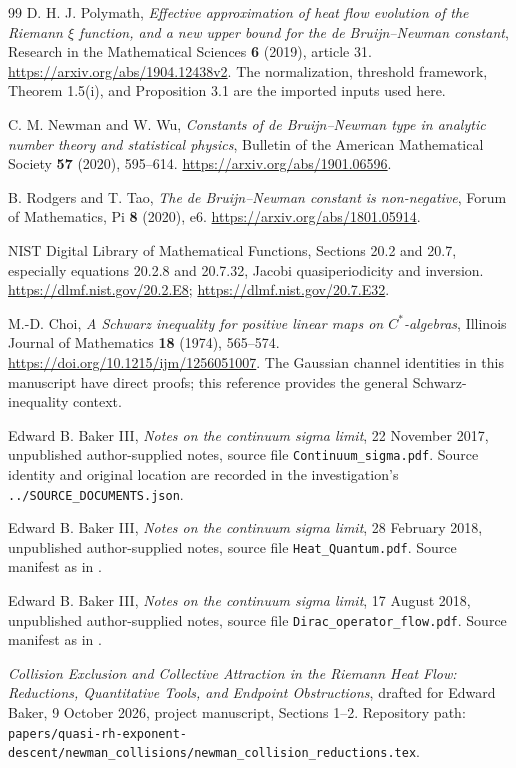 \documentclass[11pt]{article}
\numberwithin{equation}{section}
\theoremstyle{definition}
\theoremstyle{remark}
\begin{document}
\begin{thebibliography}{99}
D. H. J. Polymath,
\emph{Effective approximation of heat flow evolution of the Riemann
$\xi$ function, and a new upper bound for the de Bruijn--Newman constant},
Research in the Mathematical Sciences \textbf{6} (2019), article 31.
\url{https://arxiv.org/abs/1904.12438v2}.
The normalization, threshold framework, Theorem 1.5(i), and Proposition 3.1
are the imported inputs used here.

C. M. Newman and W. Wu,
\emph{Constants of de Bruijn--Newman type in analytic number theory and
statistical physics}, Bulletin of the American Mathematical Society
\textbf{57} (2020), 595--614.
\url{https://arxiv.org/abs/1901.06596}.

B. Rodgers and T. Tao,
\emph{The de Bruijn--Newman constant is non-negative},
Forum of Mathematics, Pi \textbf{8} (2020), e6.
\url{https://arxiv.org/abs/1801.05914}.

NIST Digital Library of Mathematical Functions,
Sections 20.2 and 20.7, especially equations 20.2.8 and 20.7.32,
Jacobi quasiperiodicity and inversion.
\url{https://dlmf.nist.gov/20.2.E8};
\url{https://dlmf.nist.gov/20.7.E32}.

M.-D. Choi,
\emph{A Schwarz inequality for positive linear maps on $C^*$-algebras},
Illinois Journal of Mathematics \textbf{18} (1974), 565--574.
\url{https://doi.org/10.1215/ijm/1256051007}.
The Gaussian channel identities in this manuscript have direct proofs;
this reference provides the general Schwarz-inequality context.

Edward B. Baker III,
\emph{Notes on the continuum sigma limit}, 22 November 2017,
unpublished author-supplied notes, source file
\texttt{Continuum\_sigma.pdf}. Source identity and original location are
recorded in the investigation's \nolinkurl{../SOURCE_DOCUMENTS.json}.

Edward B. Baker III,
\emph{Notes on the continuum sigma limit}, 28 February 2018,
unpublished author-supplied notes, source file
\texttt{Heat\_Quantum.pdf}. Source manifest as in \cite{baker2017}.

Edward B. Baker III,
\emph{Notes on the continuum sigma limit}, 17 August 2018,
unpublished author-supplied notes, source file
\texttt{Dirac\_operator\_flow.pdf}. Source manifest as in \cite{baker2017}.

\emph{Collision Exclusion and Collective Attraction in the Riemann Heat
Flow: Reductions, Quantitative Tools, and Endpoint Obstructions},
drafted for Edward Baker, 9 October 2026, project manuscript, Sections 1--2.
Repository path:
\nolinkurl{papers/quasi-rh-exponent-descent/newman_collisions/newman_collision_reductions.tex}.


\end{thebibliography}
\end{document}
